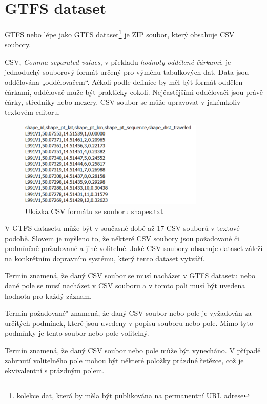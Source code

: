 
\section{GTFS dataset}
GTFS  nebo lépe jako GTFS dataset\footnote{kolekce dat, která by měla být publikována na permanentní URL adrese}
je ZIP soubor, který obsahuje CSV soubory.

CSV, \textit{Comma-separated values}, v překladu \textit{hodnoty oddělené čárkami}, je jednoduchý 
souborový formát určený pro výměnu tabulkových dat. Data jsou oddělována „oddělovačem“.
Ačkoli podle definice by měl být formát oddělen čárkami, oddělovač může být prakticky cokoli. 
Nejčastějšími oddělovači jsou právě čárky, středníky nebo mezery. CSV soubor se 
může upravovat v jakémkoliv textovém editoru.

\begin{figure}[H] \centering
    \includegraphics[width=250pt]{./pictures/ukazka-csv.PNG}
    \caption[Ukázka CSV formátu ze souboru shapes.txt]{Ukázka CSV formátu ze souboru shapes.txt}
	\label{fig:ukazka-csv}              
\end{figure}

V GTFS datasetu může být v současné době až 17 CSV souborů v textové podobě. Slovem  je myšleno to,
že některé CSV soubory jsou požadované či podmíněně požadované a jiné volitelné.
Jaké CSV soubory obsahuje dataset záleží na konkrétním dopravním systému, který
tento dataset vytváří.

Termín  znamená, že daný CSV soubor se musí nacházet v GTFS datasetu nebo dané pole
se musí nacházet v CSV souboru a v tomto poli musí být uvedena hodnota pro každý záznam. 

Termín  požadované" znamená, že daný CSV soubor nebo pole je vyžadován za určitých podmínek, 
které jsou uvedeny v popisu souboru nebo pole. Mimo tyto podmínky je tento soubor nebo pole volitelný.

Termín  znamená, že daný CSV soubor nebo pole může být vynecháno. V případě zahrnutí 
volitelného pole mohou být některé položky prázdné řetězce, což je ekvivalentní s prázdným
polem.

